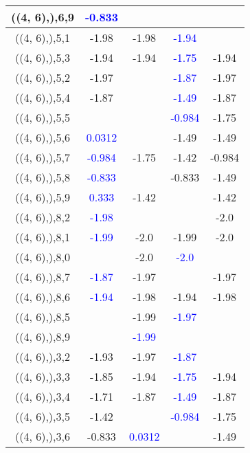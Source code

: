 \documentclass{article}
\begin{document}
\begin{center}
\begin{longtable}{|c|c|c|c|c|}
        	((4, 6),),6,9& \textcolor{blue}{-0.833}&&&\\
        	\hline
        	((4, 6),),5,1&-1.98&-1.98& \textcolor{blue}{-1.94}&\\
        	\hline
        	((4, 6),),5,3&-1.94&-1.94& \textcolor{blue}{-1.75}&-1.94\\
        	\hline
        	((4, 6),),5,2&-1.97&& \textcolor{blue}{-1.87}&-1.97\\
        	\hline
        	((4, 6),),5,4&-1.87&& \textcolor{blue}{-1.49}&-1.87\\
        	\hline
        	((4, 6),),5,5&&& \textcolor{blue}{-0.984}&-1.75\\
        	\hline
        	((4, 6),),5,6& \textcolor{blue}{0.0312}&&-1.49&-1.49\\
        	\hline
        	((4, 6),),5,7& \textcolor{blue}{-0.984}&-1.75&-1.42&-0.984\\
        	\hline
        	((4, 6),),5,8& \textcolor{blue}{-0.833}&&-0.833&-1.49\\
        	\hline
        	((4, 6),),5,9& \textcolor{blue}{0.333}&-1.42&&-1.42\\
        	\hline
        	((4, 6),),8,2& \textcolor{blue}{-1.98}&&&-2.0\\
        	\hline
        	((4, 6),),8,1& \textcolor{blue}{-1.99}&-2.0&-1.99&-2.0\\
        	\hline
        	((4, 6),),8,0&&-2.0& \textcolor{blue}{-2.0}&\\
        	\hline
        	((4, 6),),8,7& \textcolor{blue}{-1.87}&-1.97&&-1.97\\
        	\hline
        	((4, 6),),8,6& \textcolor{blue}{-1.94}&-1.98&-1.94&-1.98\\
        	\hline
        	((4, 6),),8,5&&-1.99& \textcolor{blue}{-1.97}&\\
        	\hline
        	((4, 6),),8,9&& \textcolor{blue}{-1.99}&&\\
        	\hline
        	((4, 6),),3,2&-1.93&-1.97& \textcolor{blue}{-1.87}&\\
        	\hline
        	((4, 6),),3,3&-1.85&-1.94& \textcolor{blue}{-1.75}&-1.94\\
        	\hline
        	((4, 6),),3,4&-1.71&-1.87& \textcolor{blue}{-1.49}&-1.87\\
        	\hline
        	((4, 6),),3,5&-1.42&& \textcolor{blue}{-0.984}&-1.75\\
        	\hline
        	((4, 6),),3,6&-0.833& \textcolor{blue}{0.0312}&&-1.49\\
        	\hline

\end{longtable}
\end{center}
\end{document}
